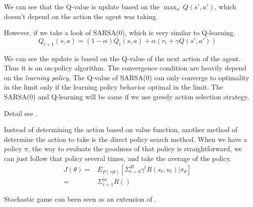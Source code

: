 \documentclass[9pt]{article}
\begin{document}
We can see that the Q-value is update based on the $\max_{a'}Q(s',a')$, which doesn't depend on the action the agent was taking.

However, if we take a look of SARSA(0), which is very similar to Q-learning.
\begin{displaymath}
  Q_{t+1}(s,a) = (1-\alpha)Q_{t}(s,a)+\alpha(r_t+\gamma Q(s',a'))
\end{displaymath}

We can see the update is based on the Q-value of the next action of the agent. Thus it is an on-policy algorithm. The convergence condition are heavily depend on the \textit{learning policy}, The Q-value of SARSA(0) can only converge to optimality in the limit only if the learning policy behavior optimal in the limit. The SARSA(0) and Q-learning will be same if we use greedy action selection strategy.

Detail see \citep{singh2000convergence}.



 Instead of determining the action based on value function, another method of determine the action to take is the direct policy search method. When we have a policy $\pi$, the way to evaluate the goodness of that policy is straightforward, we can just follow that policy several times, and take the average of the policy.
\[
	\begin{split}
	J(\theta) = & E_{P(\tau|\theta)}[\Sigma_{t=0}^{H}\gamma^tR(s_t,u_t)|\pi_{\theta}]\\
	= & \Sigma_{i=1}^m R()
	\end{split}
\]

 \Working


\Working

Stochastic game can been seen as an extension of .





\end{document}
